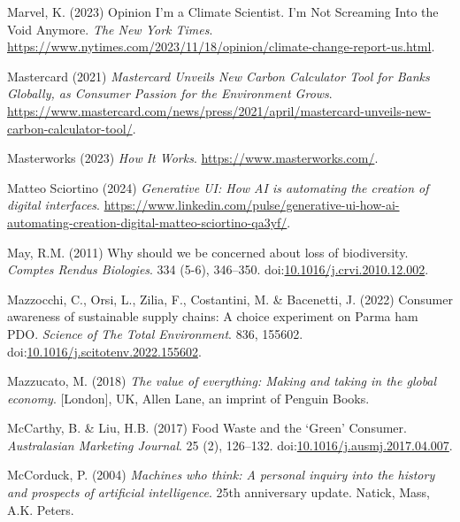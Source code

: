 \documentclass[
  letterpaper,
  DIV=11,
  numbers=noendperiod]{scrartcl}
\newlength{\cslhangindent}
\newenvironment{CSLReferences}[2] %
 {\begin{list}{}{%
  \setlength{\itemindent}{0pt}
  \setlength{\leftmargin}{0pt}
  \setlength{\parsep}{0pt}
  \ifodd #1
   \setlength{\leftmargin}{\cslhangindent}
   \setlength{\itemindent}{-1\cslhangindent}
  \fi
  \setlength{\itemsep}{#2\baselineskip}}}
 {\end{list}}
\begin{document}
\begin{CSLReferences}{0}{1}
Marvel, K. (2023) Opinion {\textbar} {I}'m a {Climate Scientist}. {I}'m
{Not Screaming Into} the {Void Anymore}. \emph{The New York Times}.
\url{https://www.nytimes.com/2023/11/18/opinion/climate-change-report-us.html}.

Mastercard (2021) \emph{Mastercard {Unveils New Carbon Calculator Tool}
for {Banks Globally}, as {Consumer Passion} for the {Environment
Grows}}.
\url{https://www.mastercard.com/news/press/2021/april/mastercard-unveils-new-carbon-calculator-tool/}.

Masterworks (2023) \emph{How {It Works}}.
\url{https://www.masterworks.com/}.

Matteo Sciortino (2024) \emph{Generative {UI}: How {AI} is automating
the creation of digital interfaces}.
\url{https://www.linkedin.com/pulse/generative-ui-how-ai-automating-creation-digital-matteo-sciortino-qa3yf/}.

May, R.M. (2011) Why should we be concerned about loss of biodiversity.
\emph{Comptes Rendus Biologies}. 334 (5-6), 346--350.
doi:\href{https://doi.org/10.1016/j.crvi.2010.12.002}{10.1016/j.crvi.2010.12.002}.

Mazzocchi, C., Orsi, L., Zilia, F., Costantini, M. \& Bacenetti, J.
(2022) Consumer awareness of sustainable supply chains: {A} choice
experiment on {Parma} ham {PDO}. \emph{Science of The Total
Environment}. 836, 155602.
doi:\href{https://doi.org/10.1016/j.scitotenv.2022.155602}{10.1016/j.scitotenv.2022.155602}.

Mazzucato, M. (2018) \emph{The value of everything: Making and taking in
the global economy}. {[}London{]}, UK, Allen Lane, an imprint of Penguin
Books.

McCarthy, B. \& Liu, H.B. (2017) Food {Waste} and the {`{Green}'}
{Consumer}. \emph{Australasian Marketing Journal}. 25 (2), 126--132.
doi:\href{https://doi.org/10.1016/j.ausmj.2017.04.007}{10.1016/j.ausmj.2017.04.007}.

McCorduck, P. (2004) \emph{Machines who think: A personal inquiry into
the history and prospects of artificial intelligence}. 25th anniversary
update. Natick, Mass, A.K. Peters.


\end{CSLReferences}
\end{document}
